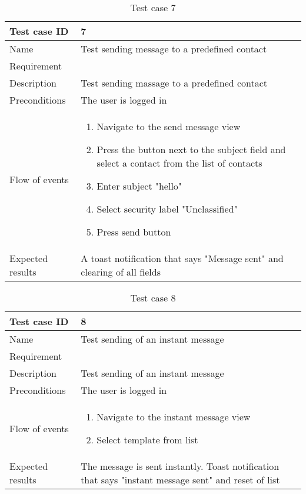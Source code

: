 \begin{table}
\begin{tabular}{l|p{10cm}}
Test case ID & 7 \\ \hline
Name & Test sending message to a predefined contact\\ \hline
Requirement & \\ \hline
Description & Test sending massage to a predefined contact\\ \hline
Preconditions & The user is logged in\\ \hline
Flow of events & 
\begin{enumerate}
\item{}Navigate to the send message view
\item{}Press the button next to the subject field and select a contact from the list of contacts
\item{}Enter subject "hello"
\item{}Select security label "Unclassified"
\item{}Press send button
\end{enumerate} \\ \hline
Expected results & A toast notification that says "Message sent" and clearing of all fields
\end{tabular}
\caption{Test case 7} \label{tab:case7}
\end{table}

\begin{table}
\begin{tabular}{l|p{10cm}}
Test case ID & 8 \\ \hline
Name & Test sending of an instant message\\ \hline
Requirement & \\ \hline
Description & Test sending of an instant message\\ \hline
Preconditions & The user is logged in\\ \hline
Flow of events & 
\begin{enumerate}
\item{}Navigate to the instant message view
\item{}Select template from list
\end{enumerate} \\ \hline
Expected results & The message is sent instantly. Toast notification that says "instant message sent" and reset of list
\end{tabular}
\caption{Test case 8} \label{tab:case8}
\end{table}

